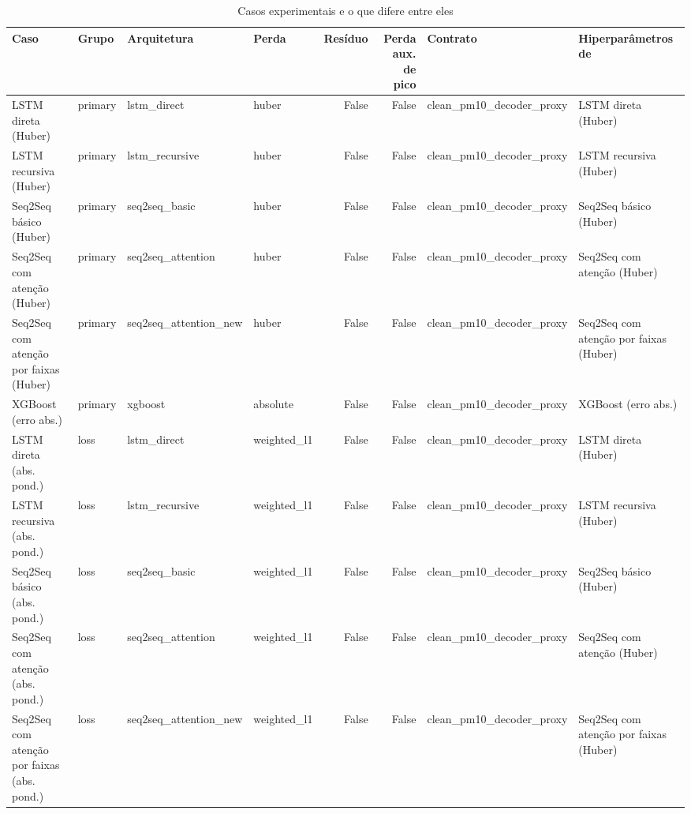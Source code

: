\begin{table}[!htbp]
    \centering
    \caption{Casos experimentais e o que difere entre eles}
    \label{tab:protocolo_diferencas}
    \small
    \begin{adjustbox}{max width=\textwidth}
    \begin{tabular}{>{\raggedright\arraybackslash}p{}lllrrl>{\raggedright\arraybackslash}p{}}
        \toprule
        Caso & Grupo & Arquitetura & Perda & Resíduo & Perda aux. de pico & Contrato & Hiperparâmetros de \\
        \midrule
        LSTM direta (Huber) & primary & lstm\_direct & huber & False & False & clean\_pm10\_decoder\_proxy & LSTM direta (Huber) \\
        LSTM recursiva (Huber) & primary & lstm\_recursive & huber & False & False & clean\_pm10\_decoder\_proxy & LSTM recursiva (Huber) \\
        Seq2Seq básico (Huber) & primary & seq2seq\_basic & huber & False & False & clean\_pm10\_decoder\_proxy & Seq2Seq básico (Huber) \\
        Seq2Seq com atenção (Huber) & primary & seq2seq\_attention & huber & False & False & clean\_pm10\_decoder\_proxy & Seq2Seq com atenção (Huber) \\
        Seq2Seq com atenção por faixas (Huber) & primary & seq2seq\_attention\_new & huber & False & False & clean\_pm10\_decoder\_proxy & Seq2Seq com atenção por faixas (Huber) \\
        XGBoost (erro abs.) & primary & xgboost & absolute & False & False & clean\_pm10\_decoder\_proxy & XGBoost (erro abs.) \\
        LSTM direta (abs. pond.) & loss & lstm\_direct & weighted\_l1 & False & False & clean\_pm10\_decoder\_proxy & LSTM direta (Huber) \\
        LSTM recursiva (abs. pond.) & loss & lstm\_recursive & weighted\_l1 & False & False & clean\_pm10\_decoder\_proxy & LSTM recursiva (Huber) \\
        Seq2Seq básico (abs. pond.) & loss & seq2seq\_basic & weighted\_l1 & False & False & clean\_pm10\_decoder\_proxy & Seq2Seq básico (Huber) \\
        Seq2Seq com atenção (abs. pond.) & loss & seq2seq\_attention & weighted\_l1 & False & False & clean\_pm10\_decoder\_proxy & Seq2Seq com atenção (Huber) \\
        Seq2Seq com atenção por faixas (abs. pond.) & loss & seq2seq\_attention\_new & weighted\_l1 & False & False & clean\_pm10\_decoder\_proxy & Seq2Seq com atenção por faixas (Huber) \\

\end{tabular}
\end{adjustbox}
\end{table}
